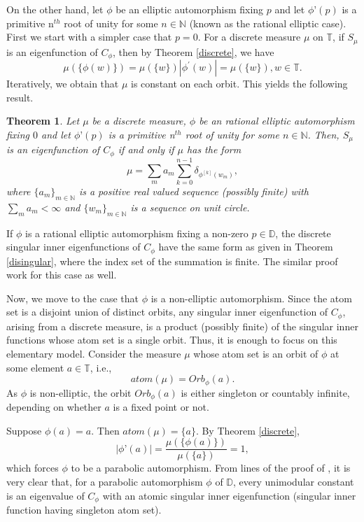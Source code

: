 \documentclass[12pt, reqno]{amsart}
\newtheorem{theorem}{Theorem}[section]
\theoremstyle{definition}
\numberwithin{equation}{section}
\begin{document}
     On the other hand, let $\phi$ be an elliptic automorphism fixing $p$ and let $\phi’(p)$ is a primitive n$^{th}$ root of unity  for some $n \in \mathbb{N}$ (known as the rational elliptic case). First we start with a simpler case that $p=0$. For a discrete measure $\mu$ on $\mathbb{T}$, if $ S_{\mu}$ is an eigenfunction of $C_\phi$, then by Theorem \ref{discrete}, we have
     $$\mu(\{\phi(w)\})=\mu(\{w\}) |\phi^{'}(w)|=\mu(\{w\}), w \in \mathbb{T}.$$
     Iteratively, we obtain that $\mu$ is constant on each orbit. This yields the following result. 
     
\begin{theorem}
	Let $\mu$ be a discrete measure, $\phi$ be an rational elliptic automorphism fixing $0$ and let $\phi’(p)$ is a primitive n$^{th}$ root of unity  for some $n \in \mathbb{N}$. Then, $S_\mu$ is an eigenfunction of $C_\phi$  if and only if $\mu$ has the form $$\mu=\sum\limits_{m}a_m\sum\limits_{k=0}^{n-1}\delta_{\phi^{[k]}(w_m)},$$ where $\{a_m\}_{m\in \mathbb{N}}$ is a positive real valued sequence (possibly finite) with $\sum_{m}a_m<\infty$ and $\{w_m\}_{m\in \mathbb{N}}$ is a sequence on unit circle.
\end{theorem}


If $\phi$ is a rational elliptic automorphism fixing a non-zero $p \in \mathbb{D}$, the discrete singular inner eigenfunctions of $C_\phi$ have the same form as given in Theorem \ref{disingular}, where the index set of the summation is finite. The similar proof work for this case as well.


Now, we move to the case that $\phi$ is a non-elliptic automorphism. Since the atom set is a disjoint union of distinct orbits, any singular inner eigenfunction of $C_\phi$, arising from a discrete measure, is a product (possibly finite) of the singular inner functions whose atom set is a single orbit. Thus, it is enough to focus on this elementary model. Consider the measure $\mu$  whose atom set is an orbit of $\phi$ at some element $a \in \mathbb{T}$, i.e., 
 $$atom(\mu)=Orb_{\phi}(a). $$
 As $\phi$ is non-elliptic, the orbit $Orb_{\phi}(a)$ is either singleton or countably infinite, depending on whether $a$ is a fixed point or not.

	Suppose $\phi(a)=a$. Then $atom(\mu)=\{a\}$. By Theorem \ref{discrete},
	$$|\phi’(a)|=\frac{\mu(\{\phi(a)\})}{{\mu(\{a\})}}=1,$$ which forces $\phi$ to be a parabolic automorphism. From lines of the proof of \cite[Lemma 5.4.6]{texthardy}, it is very clear that, for a parabolic automorphism $\phi$ of $\mathbb{D}$,  every unimodular constant is an eigenvalue of $C_\phi$ with an atomic singular inner eigenfunction (singular inner function having singleton atom set).
\end{document}

